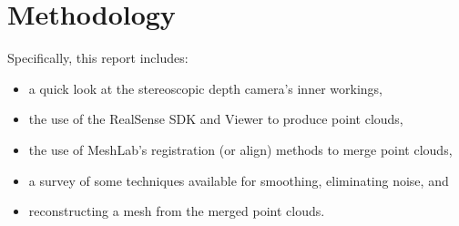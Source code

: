 \section{Methodology}
Specifically, this report includes:

 \begin{itemize}
   \item a quick look at the stereoscopic depth camera's inner workings,
   \item the use of the RealSense SDK and Viewer to produce point clouds,
   \item the use of MeshLab's registration (or align) methods to merge point clouds,
   \item a survey of some techniques available for smoothing, eliminating noise, and
   \item reconstructing a mesh from the merged point clouds.
 \end{itemize}
